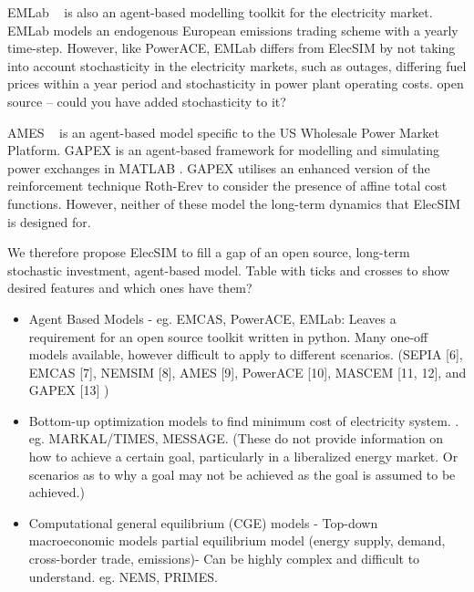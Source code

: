 EMLab ~\cite{Chappin2017} is also an agent-based modelling toolkit for the electricity market. EMLab models an endogenous European emissions trading scheme with a yearly time-step. However, like PowerACE, EMLab differs from ElecSIM by not taking into account stochasticity in the electricity markets, such as outages, differing fuel prices within a year period and stochasticity in power plant operating costs. {\color{red} open source -- could you have added stochasticity to it?}

AMES ~\cite{Sun2007} is an agent-based model specific to the US Wholesale Power Market Platform. GAPEX \cite{Cincotti2013} is an agent-based framework for modelling and simulating power exchanges in MATLAB . GAPEX utilises an enhanced version of the reinforcement technique Roth-Erev to consider the presence of affine total cost functions. However, neither of these model the long-term dynamics that ElecSIM is designed for.

We therefore propose ElecSIM to fill a gap of an open source, long-term stochastic investment, agent-based model. {\color{red}Table with ticks and crosses to show desired features and which ones have them?}

\begin{itemize}
	\item Agent Based Models - eg. EMCAS, PowerACE, EMLab: Leaves a requirement for an open source toolkit written in python. Many one-off models available, however difficult to apply to different scenarios.
	(SEPIA [6], EMCAS [7], NEMSIM [8], AMES [9], PowerACE [10], MASCEM [11, 12], and GAPEX [13] \cite{Lopes})
	\item Bottom-up optimization models to find minimum cost of electricity system. \cite{Pfenninger2014}. eg. MARKAL/TIMES, MESSAGE. (These do not provide information on how to achieve a certain goal, particularly in a liberalized energy market. Or scenarios as to why a goal may not be achieved as the goal is assumed to be achieved.)
	\item Computational general equilibrium (CGE) models - Top-down macroeconomic models partial equilibrium model (energy supply, demand, cross-border trade, emissions)- Can be highly complex and difficult to understand. eg. NEMS, PRIMES.
\end{itemize}



